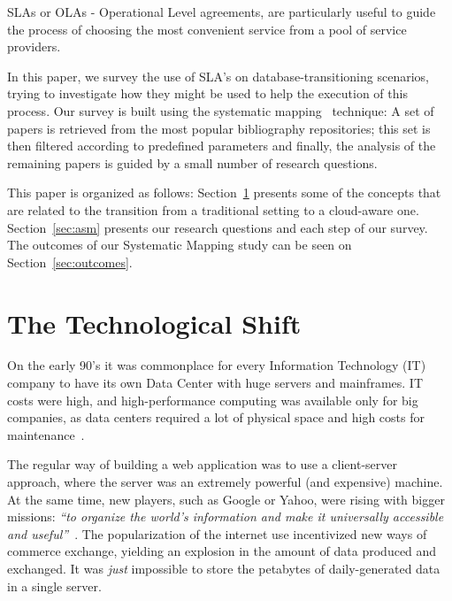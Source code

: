 \documentclass{article}
\begin{document}
SLAs or OLAs - Operational Level agreements, are particularly useful to guide the process of choosing the most convenient service from a pool of service providers.

In this paper, we survey the use of SLA's on database-transitioning scenarios, trying to investigate how they might be used to help the execution of this process.
Our survey is built using the systematic mapping~\cite{Petersen:2008:SMS:2227115.2227123} technique: A set of papers is retrieved from the most popular bibliography repositories; this set is then filtered according to predefined parameters and finally, the analysis of the remaining papers is guided by a small number of research questions.

\bigskip

This paper is organized as follows: 
Section~\ref{sec:tts} presents some of the concepts that are related to the transition from a traditional setting to a cloud-aware one.
Section~\ref{sec:asm} presents our research questions and each step of our survey. The outcomes of our Systematic Mapping study can be seen on Section~\ref{sec:outcomes}.

\section{The Technological Shift}
\label{sec:tts}


On the early 90's it was commonplace for every Information Technology (IT) company to have its own Data Center with huge servers and mainframes. 
IT costs were high, and high-performance computing was available only for big companies, as data centers required a lot of physical space and high costs for maintenance~\cite{Armbrust09m.:above}.

The regular way of building a web application was to use a client-server approach, where the server was an extremely powerful (and expensive) machine. 
At the same time, new players, such as Google or Yahoo, were rising with bigger missions: \textit{``to organize the world's information and make it universally accessible and useful''}~\cite{Spector:2012:GHA:2209249.2209262}. 
The popularization of the internet use incentivized new ways of commerce exchange, yielding an explosion in the amount of data produced and exchanged. 
It was \textit{just} impossible to store the petabytes of daily-generated data in a single server. 
\end{document}
